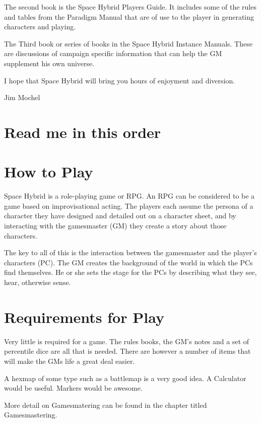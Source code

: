 The second book is the Space Hybrid Players Guide. It includes 
some of the rules and tables from the Paradigm Manual that are of use to
the player in generating characters and playing. 

The Third book or series of books in the Space Hybrid Instance Manuals.
These are discussions of campaign specific information that can help the
GM supplement his own universe.

I hope that Space Hybrid will bring you hours of enjoyment and
diversion.

\begin{em}
	Jim Mochel
\end{em}

\section{Read me in this order}

\section{How to Play}

Space Hybrid is a role-playing game or RPG. An RPG can be
considered to be a game based on improvisational acting. 
The players each assume the persona of a character they have
designed and detailed out on a character sheet, and by interacting
with the gamesmaster (GM) they create a story about those characters.

The key to all of this is the interaction between the gamesmaster and the 
player's characters (PC). The GM creates the background of the world in which
the PCs find themselves. He or she sets the stage for the PCs by describing
what they see, hear, otherwise sense. 

\section{Requirements for Play}

Very little is required for a game. The rules books, the GM's notes 
and a set of percentile dice are all that is needed. There are however 
a number of items that will make the GMs life a great deal easier.

A hexmap of some type such as a battlemap is a very good idea.
A Calculator would be useful. Markers would be awesome.

More detail on Gamesmatering can be found in the chapter titled
Gamesmastering.





